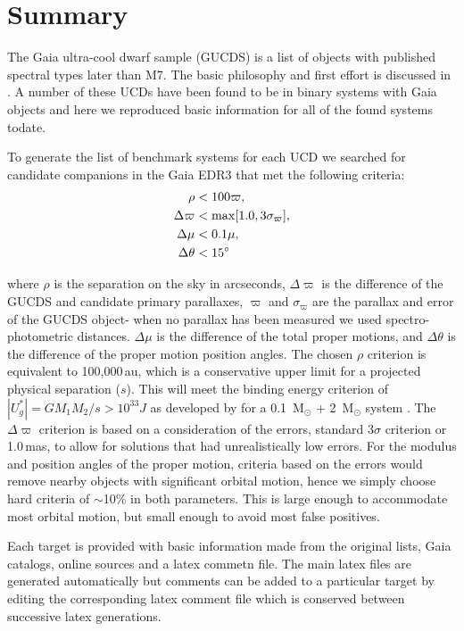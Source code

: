 \newpage
\section{Summary}
The Gaia ultra-cool dwarf sample (GUCDS) is a list of objects with
published spectral types later than M7. The basic philosophy and first
effort is discussed in \cite{2017MNRAS.469..401S}. A number of these
UCDs have been found to be in binary systems with Gaia objects and here we
reproduced basic information for all of the found systems todate.


To generate the list of benchmark systems for each UCD we searched for
candidate companions in the Gaia EDR3 that met the following criteria:
\begin{equation} \label{eq1}
\begin{split}
\rho         & < 100 \varpi, \\
\Delta\varpi & < {\rm max}[1.0,3\sigma_{\varpi}],\\
\Delta\mu    & < 0.1\mu,\\
\Delta\theta & < 15\degree
\end{split}
\end{equation}

\noindent where $\rho$ is the separation on the sky in arcseconds,
$\Delta\varpi$ is the difference of the GUCDS and candidate primary
parallaxes, $\varpi$ and $\sigma_{\varpi}$ are the parallax and error
of the GUCDS object- when no parallax has been measured we used
spectro-photometric distances. $\Delta\mu$ is the difference of the
total proper motions, and $\Delta\theta$ is the difference of the
proper motion position angles. The chosen $\rho$ criterion is
equivalent to 100,000\,au, which is a conservative upper limit for a
projected physical separation ($s$). This will meet the binding energy
criterion of $ |U_g^*| = G M_1 M_2 / s > 10^{33} J $ as developed by
\cite{2009A&A...507..251C} for a 0.1~M$_{\odot}$ + 2~M$_{\odot}$
system \cite{2010AJ....139.2566D}. The $\Delta\varpi$
criterion is based on a consideration of the errors, standard
3$\sigma$ criterion or 1.0\,mas, to allow for solutions that had
unrealistically low errors. For the modulus and position angles of the
proper motion, criteria based on the errors would remove nearby
objects with significant orbital motion, hence we simply choose hard
criteria of $\sim$10\% in both parameters. This is large enough to
accommodate most orbital motion, but small enough to avoid most false
positives.

Each target is provided with basic information made from the original
lists, Gaia catalogs, online sources and a latex commetn file. The
main latex files are generated automatically but comments can be added
to a particular target by editing the corresponding latex comment file
which is conserved between successive latex generations.



